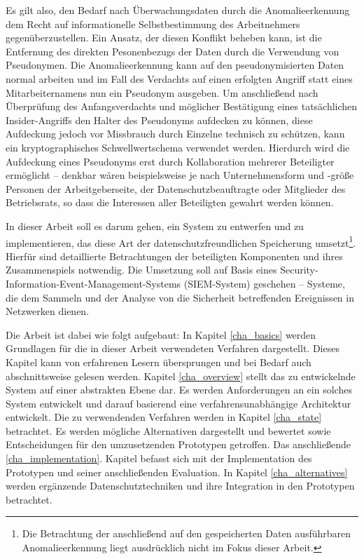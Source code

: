 Es gilt also, den Bedarf nach Überwachungsdaten durch die Anomalieerkennung dem Recht auf informationelle Selbstbestimmung des Arbeitnehmers gegenüberzustellen. 
Ein Ansatz, der diesen Konflikt beheben kann, ist die Entfernung des direkten Pesonenbezugs der Daten durch die Verwendung von Pseudonymen. Die Anomalieerkennung kann auf den pseudonymisierten Daten normal arbeiten und im Fall des Verdachts auf einen erfolgten Angriff statt eines Mitarbeiternamens nun ein Pseudonym ausgeben. %
Um anschließend nach Überprüfung des Anfangsverdachts und möglicher Bestätigung eines tatsächlichen Insider-Angriffs den Halter des Pseudonyms aufdecken zu können, diese Aufdeckung jedoch vor Missbrauch durch Einzelne technisch zu schützen, kann ein kryptographisches Schwellwertschema verwendet werden. Hierdurch wird die Aufdeckung eines Pseudonyms erst durch Kollaboration mehrerer Beteiligter ermöglicht -- denkbar wären beispielsweise je nach Unternehmensform und -größe Personen der Arbeitgeberseite, der Datenschutzbeauftragte oder Mitglieder des Betriebsrats, so dass die Interessen aller Beteiligten gewahrt werden können.

In dieser Arbeit soll es darum gehen, ein System zu entwerfen und zu implementieren, das diese Art der datenschutzfreundlichen Speicherung umsetzt\footnote{
  Die Betrachtung der anschließend auf den gespeicherten Daten ausführbaren Anomalieerkennung liegt ausdrücklich nicht im Fokus dieser Arbeit. 
}. Hierfür sind detaillierte Betrachtungen der beteiligten Komponenten und ihres Zusammenspiels notwendig. Die Umsetzung soll auf Basis eines Security-Information-Event-Management-Systems (SIEM-System) geschehen -- Systeme, die dem Sammeln und der Analyse von die Sicherheit betreffenden Ereignissen in Netzwerken dienen.

Die Arbeit ist dabei wie folgt aufgebaut:
In Kapitel \ref{cha_basics} werden Grundlagen für die in dieser Arbeit verwendeten Verfahren dargestellt. Dieses Kapitel kann von erfahrenen Lesern übersprungen und bei Bedarf auch abschnittsweise gelesen werden. 
Kapitel \ref{cha_overview} stellt das zu entwickelnde System auf einer abstrakten Ebene dar. Es werden Anforderungen an ein solches System entwickelt und darauf basierend eine verfahrensunabhängige Architektur entwickelt.
Die zu verwendenden Verfahren werden in Kapitel \ref{cha_state} betrachtet. Es werden mögliche Alternativen dargestellt und bewertet sowie Entscheidungen für den umzusetzenden Prototypen getroffen.
Das anschließende \ref{cha_implementation}. Kapitel befasst sich mit der Implementation des Prototypen und seiner anschließenden Evaluation. 
In Kapitel \ref{cha_alternatives} werden ergänzende Datenschutztechniken und ihre Integration in den Prototypen betrachtet.

